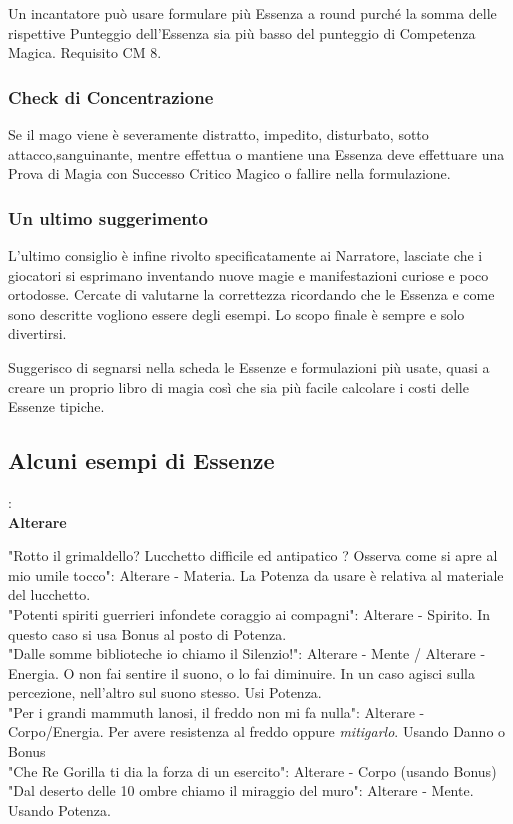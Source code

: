 \documentclass[a4paper,twoside,openany]{book}
\begin{document}
\begin{multicols}{2}
Un incantatore può usare formulare più Essenza a round purché la somma delle rispettive Punteggio dell'Essenza sia più basso del punteggio di Competenza Magica. Requisito CM 8.


\subsubsection{Check di Concentrazione}

Se il mago viene è severamente distratto, impedito, disturbato, sotto attacco,sanguinante, mentre effettua o mantiene una Essenza deve effettuare una Prova di Magia con Successo Critico Magico o fallire nella formulazione.


\subsubsection{Un ultimo suggerimento}

L'ultimo consiglio è infine rivolto specificatamente ai Narratore, lasciate che i giocatori si esprimano inventando nuove magie e manifestazioni curiose e poco ortodosse. Cercate di valutarne la correttezza ricordando che le Essenza e come sono descritte vogliono essere degli esempi. Lo scopo finale è sempre e solo divertirsi.


\bigskip

Suggerisco di segnarsi nella scheda le Essenze e formulazioni più usate, quasi a creare un proprio libro di magia così che sia più facile calcolare i costi delle Essenze tipiche.

\bigskip



\subsection{Alcuni esempi di Essenze}:\\


\textbf{Alterare}

"Rotto il grimaldello? Lucchetto difficile ed antipatico ? Osserva come si apre al mio umile tocco": Alterare - Materia. La Potenza da usare è relativa al materiale del lucchetto.\\
"Potenti spiriti guerrieri infondete coraggio ai compagni": Alterare - Spirito. In questo caso si usa Bonus al posto di Potenza.\\
"Dalle somme biblioteche io chiamo il Silenzio!": Alterare - Mente / Alterare - Energia. O non fai sentire il suono, o lo fai diminuire. In un caso agisci sulla percezione, nell'altro sul suono stesso. Usi Potenza.\\
"Per i grandi mammuth lanosi, il freddo non mi fa nulla": Alterare - Corpo/Energia. Per avere resistenza al freddo oppure \emph{mitigarlo}. Usando Danno o Bonus\\
"Che Re Gorilla ti dia la forza di un esercito": Alterare - Corpo (usando Bonus)\\
"Dal deserto delle 10 ombre chiamo il miraggio del muro": Alterare - Mente. Usando Potenza.\\


\end{multicols}
\end{document}
